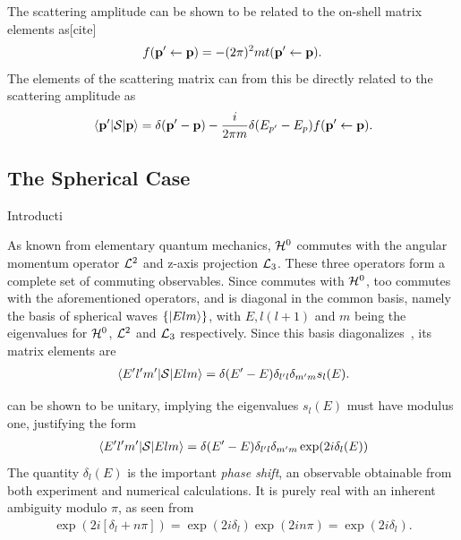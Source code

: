 The scattering amplitude can be shown to be related to the on-shell 
matrix elements as[cite]
\begin{align*}
  f(\vb{p}^{\prime} \leftarrow \vb{p})= -(2\pi)^{2}mt(\vb{p}^{\prime}\leftarrow\vb{p}).
\end{align*}
The elements of the scattering matrix can from this be directly related to the
scattering amplitude as
\begin{align*}
  \mel{\vb{p}^{\prime}}{\mathcal{S}}{\vb{p}} = \delta(\vb{p}^{\prime} - \vb{p}) - \frac{i}{2\pi m}\delta(E_{p^{\prime}}-E_{p})f(\vb{p}^{\prime}\leftarrow \vb{p}).
\end{align*}

\subsection{The Spherical Case}

Introducti

As known from elementary quantum mechanics, \(\mathcal{H}^{0}\) commutes with the
angular momentum operator \(\mathcal{L}^{2}\) and z-axis projection \(\mathcal{L}_{3}\).
These three operators form a complete set of commuting observables. Since
\mscat{} commutes with \(\mathcal{H}^{0}\), \mscat{} too commutes with the
aforementioned 
operators, and is diagonal in the common basis, namely the basis of spherical waves
\(\left\{ \ket{Elm} \right\}\), with \(E, l(l+1)\) and \(m\) being the
eigenvalues for \(\mathcal{H}^{0}\),  \(\mathcal{L}^{2}\) and  \(\mathcal{L}_{3}\)
respectively. Since this basis diagonalizes\ \mscat{}, its matrix elements are
\begin{align*}
  \mel{E^{\prime}l^{\prime}m^{\prime}}{\mathcal{S}}{Elm} = \delta(E^{\prime}-E)\delta_{l^{\prime}l}\delta_{m^{\prime}m}s_{l}(E).
\end{align*}

\mscat{} can be shown to be unitary, implying the eigenvalues \(s_{l}(E)\) must have
modulus one, justifying the form
\begin{align*}
  \mel{E^{\prime}l^{\prime}m^{\prime}}{\mathcal{S}}{Elm} = \delta(E^{\prime}-E)\delta_{l^{\prime}l}\delta_{m^{\prime}m}\exp(2i\delta_{l}(E))
\end{align*}
The quantity \(\delta_{l}(E)\) is the important \textit{phase shift}, an
observable obtainable from both experiment and numerical calculations. It is
purely real with an inherent ambiguity modulo \(\pi\), as seen from
\begin{align*}
  \exp(2i[\delta_{l}+n\pi]) = \exp(2i\delta_{l})\exp(2in\pi) = \exp(2i\delta_{l}).
\end{align*}

